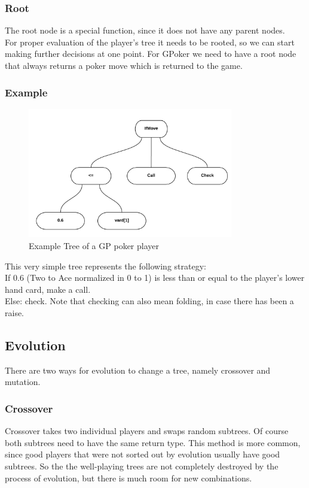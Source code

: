 \documentclass[12pt,fleqn,a4paper]{article}
\begin{document}
\subsubsection{Root}
The root node is a special function, since it does not have any parent nodes.\\
For proper evaluation of the player's tree it needs to be rooted, so we can start making further decisions at one point.
For GPoker we need to have a root node that always returns a poker move which is returned to the game.\\

\newpage

\subsubsection{Example}
\begin{figure}[!ht]
\begin{center}
	\includegraphics[width=0.8\textwidth]{tree1.png}
\caption{Example Tree of a GP poker player}
\end{center}
\end{figure}
This very simple tree represents the following strategy:
~\\
If 0.6 (Two to Ace normalized in 0 to 1) is less than or equal to the player's lower hand card, make a call.\\
Else: check. Note that checking can also mean folding, in case there has been a raise.

\subsection{Evolution}
There are two ways for evolution to change a tree, namely crossover and mutation.

\subsubsection{Crossover}
Crossover takes two individual players and swaps random subtrees.
Of course both subtrees need to have the same return type.
This method is more common, since good players that were not sorted out by evolution usually have good subtrees.
So the the well-playing trees are not completely destroyed by the process of evolution, but there is much room for new combinations.
\end{document}
